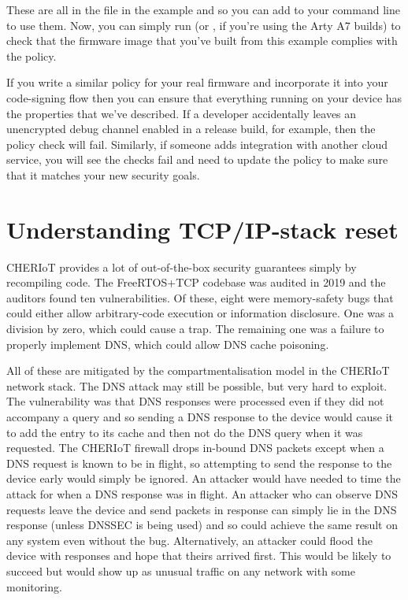 These are all in the  file in the example and so you can add  to your  command line to use them.
Now, you can simply run  (or , if you're using the Arty A7 builds) to check that the firmware image that you've built from this example complies with the policy.

If you write a similar policy for your real firmware and incorporate it into your code-signing flow then you can ensure that everything running on your device has the properties that we've described.
If a developer accidentally leaves an unencrypted debug channel enabled in a release build, for example, then the policy check will fail.
Similarly, if someone adds integration with another cloud service, you will see the checks fail and need to update the policy to make sure that it matches your new security goals.

\section[label=netreset]{Understanding TCP/IP-stack reset}

CHERIoT provides a lot of out-of-the-box security guarantees simply by recompiling code.
The FreeRTOS+TCP codebase was audited in 2019 and the auditors found ten vulnerabilities.
Of these, eight were memory-safety bugs that could either allow arbitrary-code execution or information disclosure.
One was a division by zero, which could cause a trap.
The remaining one was a failure to properly implement DNS, which could allow DNS cache poisoning.

All of these are mitigated by the compartmentalisation model in the CHERIoT network stack.
The DNS attack may still be possible, but very hard to exploit.
The vulnerability was that DNS responses were processed even if they did not accompany a query and so sending a DNS response to the device would cause it to add the entry to its cache and then not do the DNS query when it was requested.
The CHERIoT firewall drops in-bound DNS packets except when a DNS request is known to be in flight, so attempting to send the response to the device early would simply be ignored.
An attacker would have needed to time the attack for when a DNS response was in flight.
An attacker who can observe DNS requests leave the device and send packets in response can simply lie in the DNS response (unless DNSSEC is being used) and so could achieve the same result on any system even without the bug.
Alternatively, an attacker could flood the device with responses and hope that theirs arrived first.
This would be likely to succeed but would show up as unusual traffic on any network with some monitoring.

